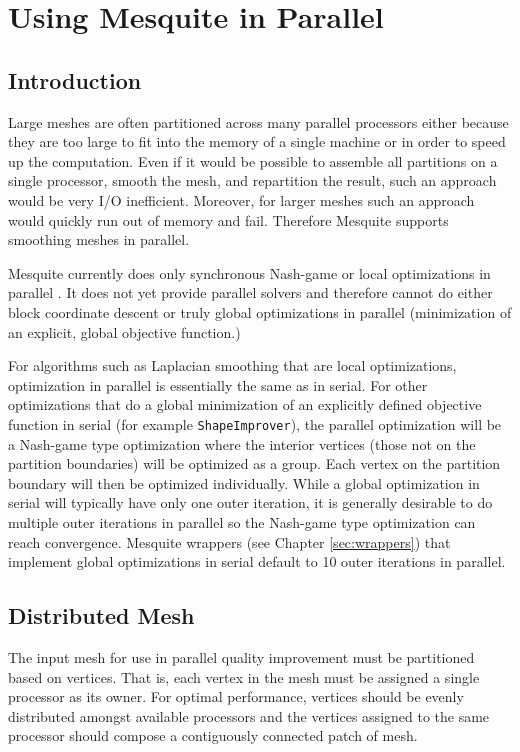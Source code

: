 \chapter{Using Mesquite in Parallel}
\label{sec:parallel}

\section{Introduction}

Large meshes are often partitioned across many parallel processors either because they are too large to fit into the memory of a single machine or in order to speed up the computation. Even if it would be possible to assemble all partitions on a single processor, smooth the mesh, and repartition the result, such an approach would be very I/O inefficient. Moreover, for larger meshes such an approach would quickly run out of memory and fail. Therefore Mesquite supports smoothing meshes in parallel.

Mesquite currently does only synchronous Nash-game or local optimizations in parallel \cite{Fr95}.  It does not yet provide parallel solvers and therefore cannot do either block coordinate descent or truly global optimizations in parallel (minimization of an explicit, global objective function.)  

For algorithms such as Laplacian smoothing that are local optimizations, optimization in parallel is essentially the same as in serial.  For other optimizations that do a global minimization of an explicitly defined objective function in serial (for example \texttt{ShapeImprover}), the parallel optimization will be a Nash-game type optimization where the interior vertices (those not on the partition boundaries) will be optimized as a group.  Each vertex on the partition boundary will then be optimized individually.  While a global optimization in serial will typically have only one outer iteration, it is generally desirable to do multiple outer iterations in parallel so the Nash-game type optimization can reach convergence.  Mesquite wrappers (see Chapter \ref{sec:wrappers}) that implement global optimizations in serial default to 10 outer iterations in parallel.


\section{Distributed Mesh}

The input mesh for use in parallel quality improvement must be partitioned based on vertices.  That is, each vertex in the mesh must be assigned a single processor as its owner.  For optimal performance, vertices should be evenly distributed amongst available processors and the vertices assigned to the same processor should compose a contiguously connected patch of mesh.  

